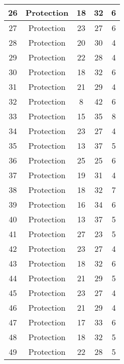 \documentclass[results.tex]{subfiles}
\begin{document}
\begin{center}
\begin{tabular}{| c || c | c | c | c |}
    \hline
    26 & Protection & 18 & 32 & 6 \\ 
    \hline
    27 & Protection & 23 & 27 & 6 \\ 
    \hline
    28 & Protection & 20 & 30 & 4 \\ 
    \hline
    29 & Protection & 22 & 28 & 4 \\ 
    \hline
    30 & Protection & 18 & 32 & 6 \\ 
    \hline
    31 & Protection & 21 & 29 & 4 \\ 
    \hline
    32 & Protection & 8 & 42 & 6 \\ 
    \hline
    33 & Protection & 15 & 35 & 8 \\ 
    \hline
    34 & Protection & 23 & 27 & 4 \\ 
    \hline
    35 & Protection & 13 & 37 & 5 \\ 
    \hline
    36 & Protection & 25 & 25 & 6 \\ 
    \hline
    37 & Protection & 19 & 31 & 4 \\ 
    \hline
    38 & Protection & 18 & 32 & 7 \\ 
    \hline
    39 & Protection & 16 & 34 & 6 \\ 
    \hline
    40 & Protection & 13 & 37 & 5 \\ 
    \hline
    41 & Protection & 27 & 23 & 5 \\ 
    \hline
    42 & Protection & 23 & 27 & 4 \\ 
    \hline
    43 & Protection & 18 & 32 & 6 \\ 
    \hline
    44 & Protection & 21 & 29 & 5 \\ 
    \hline
    45 & Protection & 23 & 27 & 4 \\ 
    \hline
    46 & Protection & 21 & 29 & 4 \\ 
    \hline
    47 & Protection & 17 & 33 & 6 \\ 
    \hline
    48 & Protection & 18 & 32 & 5 \\ 
    \hline
    49 & Protection & 22 & 28 & 5 \\ 
    \hline   \end{tabular}
\end{center}
\end{document}
